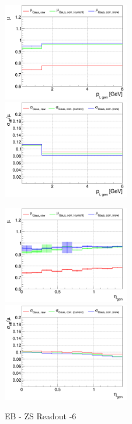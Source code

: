 \begin{figure}
\includegraphics[width=0.495\textwidth]{./plots_pdf/ECAL_plots/plotsNOPU/EB/ZS/pdf/GENPT/EBZS_GENPT_0000_0006_MuOverBins.pdf}
\includegraphics[width=0.495\textwidth]{./plots_pdf/ECAL_plots/plotsNOPU/EB/ZS/pdf/GENPT/EBZS_GENPT_0000_0006_EffSigmaOverBins.pdf}

\includegraphics[width=0.495\textwidth]{./plots_pdf/ECAL_plots/plotsNOPU/EB/ZS/pdf/GENETA/EBZS_GENETA_0000_0006_MuOverBins.pdf}
\includegraphics[width=0.495\textwidth]{./plots_pdf/ECAL_plots/plotsNOPU/EB/ZS/pdf/GENETA/EBZS_GENETA_0000_0006_EffSigmaOverBins.pdf}
\caption[]{EB - ZS Readout -6}


\end{figure}
